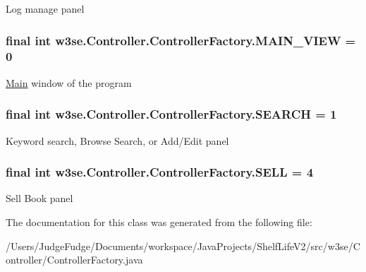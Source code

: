 Log manage panel \hypertarget{classw3se_1_1_controller_1_1_controller_factory_a6a7ccd51a6578a23662085daf56dde92}{
\subsubsection[{M\-A\-I\-N\-\_\-\-V\-I\-E\-W}]{\setlength{\rightskip}{0pt plus 5cm}final int w3se.\-Controller.\-Controller\-Factory.\-M\-A\-I\-N\-\_\-\-V\-I\-E\-W = 0\hspace{0.3cm}{\ttfamily [static]}}}\label{classw3se_1_1_controller_1_1_controller_factory_a6a7ccd51a6578a23662085daf56dde92}
\hyperlink{classw3se_1_1_main}{Main} window of the program \hypertarget{classw3se_1_1_controller_1_1_controller_factory_a6b4f99f28f772b04d83cd840a52add01}{
\subsubsection[{S\-E\-A\-R\-C\-H}]{\setlength{\rightskip}{0pt plus 5cm}final int w3se.\-Controller.\-Controller\-Factory.\-S\-E\-A\-R\-C\-H = 1\hspace{0.3cm}{\ttfamily [static]}}}\label{classw3se_1_1_controller_1_1_controller_factory_a6b4f99f28f772b04d83cd840a52add01}
Keyword search, Browse Search, or Add/\-Edit panel \hypertarget{classw3se_1_1_controller_1_1_controller_factory_ab55317e2c56d181b48ad9928ec83aef4}{
\subsubsection[{S\-E\-L\-L}]{\setlength{\rightskip}{0pt plus 5cm}final int w3se.\-Controller.\-Controller\-Factory.\-S\-E\-L\-L = 4\hspace{0.3cm}{\ttfamily [static]}}}\label{classw3se_1_1_controller_1_1_controller_factory_ab55317e2c56d181b48ad9928ec83aef4}
Sell Book panel 

The documentation for this class was generated from the following file\-:\begin{DoxyCompactItemize}
\item 
/\-Users/\-Judge\-Fudge/\-Documents/workspace/\-Java\-Projects/\-Shelf\-Life\-V2/src/w3se/\-Controller/Controller\-Factory.\-java\end{DoxyCompactItemize}

